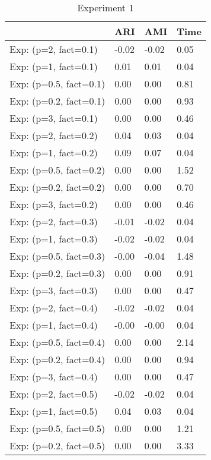 \begin{table}
\centering
\caption{Experiment 1}
\begin{tabular}{llll}
\toprule
{} &    ARI &    AMI &  Time \\
\midrule
Exp: (p=2, fact=0.1)   &  -0.02 &  -0.02 &  0.05 \\
\midrule
Exp: (p=1, fact=0.1)   &   0.01 &   0.01 &  0.04 \\
\midrule
Exp: (p=0.5, fact=0.1) &   0.00 &   0.00 &  0.81 \\
\midrule
Exp: (p=0.2, fact=0.1) &   0.00 &   0.00 &  0.93 \\
\midrule
Exp: (p=3, fact=0.1)   &   0.00 &   0.00 &  0.46 \\
\midrule
Exp: (p=2, fact=0.2)   &   0.04 &   0.03 &  0.04 \\
\midrule
Exp: (p=1, fact=0.2)   &   0.09 &   0.07 &  0.04 \\
\midrule
Exp: (p=0.5, fact=0.2) &   0.00 &   0.00 &  1.52 \\
\midrule
Exp: (p=0.2, fact=0.2) &   0.00 &   0.00 &  0.70 \\
\midrule
Exp: (p=3, fact=0.2)   &   0.00 &   0.00 &  0.46 \\
\midrule
Exp: (p=2, fact=0.3)   &  -0.01 &  -0.02 &  0.04 \\
\midrule
Exp: (p=1, fact=0.3)   &  -0.02 &  -0.02 &  0.04 \\
\midrule
Exp: (p=0.5, fact=0.3) &  -0.00 &  -0.04 &  1.48 \\
\midrule
Exp: (p=0.2, fact=0.3) &   0.00 &   0.00 &  0.91 \\
\midrule
Exp: (p=3, fact=0.3)   &   0.00 &   0.00 &  0.47 \\
\midrule
Exp: (p=2, fact=0.4)   &  -0.02 &  -0.02 &  0.04 \\
\midrule
Exp: (p=1, fact=0.4)   &  -0.00 &  -0.00 &  0.04 \\
\midrule
Exp: (p=0.5, fact=0.4) &   0.00 &   0.00 &  2.14 \\
\midrule
Exp: (p=0.2, fact=0.4) &   0.00 &   0.00 &  0.94 \\
\midrule
Exp: (p=3, fact=0.4)   &   0.00 &   0.00 &  0.47 \\
\midrule
Exp: (p=2, fact=0.5)   &  -0.02 &  -0.02 &  0.04 \\
\midrule
Exp: (p=1, fact=0.5)   &   0.04 &   0.03 &  0.04 \\
\midrule
Exp: (p=0.5, fact=0.5) &   0.00 &   0.00 &  1.21 \\
\midrule
Exp: (p=0.2, fact=0.5) &   0.00 &   0.00 &  3.33 \\

\end{tabular}
\end{table}
